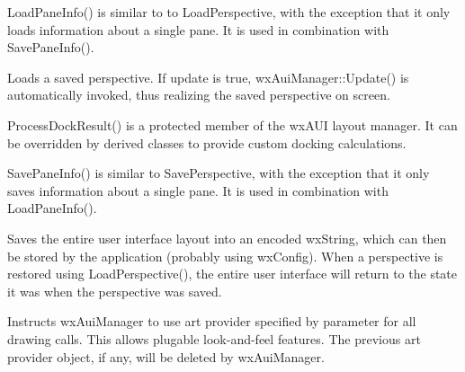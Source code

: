 \label{wxauimanagerloadpaneinfo}


LoadPaneInfo() is similar to to LoadPerspective, with the exception that it only loads information about a single pane.  It is used in combination with SavePaneInfo().

\label{wxauimanagerloadperspective}


Loads a saved perspective. If update is true, wxAuiManager::Update()
is automatically invoked, thus realizing the saved perspective on screen.

\label{wxauimanagerprocessdockresult}


ProcessDockResult() is a protected member of the wxAUI layout manager.  It can be overridden by derived classes to provide custom docking calculations.

\label{wxauimanagersavepaneinfo}


SavePaneInfo() is similar to SavePerspective, with the exception that it only saves information about a single pane.  It is used in combination with LoadPaneInfo().

\label{wxauimanagersaveperspective}


Saves the entire user interface layout into an encoded wxString, which
can then be stored by the application (probably using wxConfig). When
a perspective is restored using LoadPerspective(), the entire user
interface will return to the state it was when the perspective was saved.

\label{wxauimanagersetartprovider}


Instructs wxAuiManager to use art provider specified by parameter
 for all drawing calls. This allows plugable
look-and-feel features. The previous art provider object, if any,
will be deleted by wxAuiManager.

